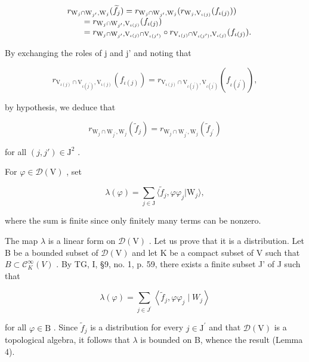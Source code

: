 \[
\begin{array}{r l} & r _ {\mathrm{W} _ {j} \cap \mathrm{W} _ {j ^ {\prime}}, \mathrm{W} _ {j}} (\widetilde {f} _ {j}) = r _ {\mathrm{W} _ {j} \cap \mathrm{W} _ {j ^ {\prime}}, \mathrm{W} _ {j}} (r _ {\mathrm{W} _ {j}, \mathrm{V} _ {\iota (j)}} (f _ {\iota (j)})) \\ & \qquad = r _ {\mathrm{W} _ {j} \cap \mathrm{W} _ {j ^ {\prime}}, \mathrm{V} _ {\iota (j)}} (f _ {\iota (j)}) \\ & \qquad = r _ {\mathrm{W} _ {j} \cap \mathrm{W} _ {j ^ {\prime}}, \mathrm{V} _ {\iota (j)} \cap \mathrm{V} _ {\iota (j ^ {\prime})}} \circ r _ {\mathrm{V} _ {\iota (j)} \cap \mathrm{V} _ {\iota (j ^ {\prime})}, \mathrm{V} _ {\iota (j)}} (f _ {\iota (j)}). \end{array}
\]

By exchanging the roles of j and j' and noting that

\[
r _ {\mathrm{V} _ {\iota (j)} \cap \mathrm{V} _ {\iota (j ^ {\prime})}, \mathrm{V} _ {\iota (j)}} (f _ {\iota (j)}) = r _ {\mathrm{V} _ {\iota (j)} \cap \mathrm{V} _ {\iota (j ^ {\prime})}, \mathrm{V} _ {\iota (j ^ {\prime})}} (f _ {\iota (j ^ {\prime})}),
\]

by hypothesis, we deduce that

\[
r _ {\mathrm{W} _ {j} \cap \mathrm{W} _ {j ^ {\prime}}, \mathrm{W} _ {j}} (\widetilde {f} _ {j}) = r _ {\mathrm{W} _ {j} \cap \mathrm{W} _ {j ^ {\prime}}, \mathrm{W} _ {j}} (\widetilde {f} _ {j ^ {\prime}})\tag{1}
\]

for all \((j, j') \in \mathrm{J}^{2}\) .

For \(\varphi \in \mathcal{D}(\mathrm{V})\) , set

\[
\lambda (\varphi) = \sum_ {j \in \mathrm{J}} \langle \widetilde {f} _ {j}, \varphi \varphi_ {j} | \mathrm{W} _ {j} \rangle ,
\]

where the sum is finite since only finitely many terms can be nonzero.

The map \(\lambda\) is a linear form on \(\mathcal{D}(\mathrm{V})\) . Let us prove that it is a distribution. Let B be a bounded subset of \(\mathcal{D}(\mathrm{V})\) and let K be a compact subset of V such that \(B \subset \mathcal{C}_{K}^{\infty}(V)\) . By TG, I, §9, no. 1, p. 59, there exists a finite subset J' of J such that

\[
\lambda (\varphi) = \sum_ {j \in J ^ {\prime}} \left\langle \widetilde {f} _ {j}, \varphi \varphi_ {j} \mid W _ {j} \right\rangle
\]

for all \(\varphi\in\mathrm{B}\) . Since \(\widetilde{f}_{j}\) is a distribution for every \(j\in\mathrm{J}^{\prime}\) and that \(\mathcal{D}(\mathrm{V})\) is a topological algebra, it follows that \(\lambda\) is bounded on B, whence the result (Lemma 4).

